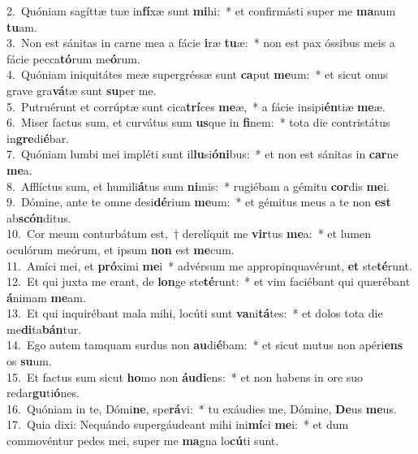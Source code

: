 {2.~}Quóniam sagíttæ tuæ in\textbf{fí}xæ sunt \textbf{mi}hi:~* et confirmásti super me \textbf{ma}num \textbf{tu}am.\\
{3.~}Non est sánitas in carne mea a fácie \textbf{i}ræ \textbf{tu}æ:~* non est pax óssibus meis a fácie pecca\textbf{tó}rum me\textbf{ó}rum.\\
{4.~}Quóniam iniquitátes meæ supergréssæ sunt \textbf{ca}put \textbf{me}um:~* et sicut onus grave gra\textbf{vá}tæ sunt \textbf{su}per me.\\
{5.~}Putruérunt et corrúptæ sunt cica\textbf{trí}ces \textbf{me}æ,~* a fácie insipi\textbf{én}tiæ \textbf{me}æ.\\
{6.~}Miser factus sum, et curvátus sum \textbf{us}que in \textbf{fi}nem:~* tota die contristátus in\textbf{gre}di\textbf{é}bar.\\
{7.~}Quóniam lumbi mei impléti sunt il\textbf{lu}si\textbf{ó}\textbf{ni}bus:~* et non est sánitas in \textbf{car}ne \textbf{me}a.\\
{8.~}Afflíctus sum, et humili\textbf{á}tus sum \textbf{ni}mis:~* rugiébam a gémitu \textbf{cor}dis \textbf{me}i.\\
{9.~}Dómine, ante te omne desi\textbf{dé}rium \textbf{me}um:~* et gémitus meus a te non \textbf{est} ab\textbf{scón}ditus.\\
{10.~}Cor meum conturbátum est,~† derelíquit me \textbf{vir}tus \textbf{me}a:~* et lumen oculórum meórum, et ipsum \textbf{non} est \textbf{me}cum.\\
{11.~}Amíci mei, et \textbf{pró}ximi \textbf{me}i~* advérsum me appropinquavérunt, \textbf{et} ste\textbf{té}runt.\\
{12.~}Et qui juxta me erant, de \textbf{lon}ge ste\textbf{té}runt:~* et vim faciébant qui quærébant \textbf{á}nimam \textbf{me}am.\\
{13.~}Et qui inquirébant mala mihi, locúti sunt \textbf{va}ni\textbf{tá}tes:~* et dolos tota die me\textbf{di}ta\textbf{bán}tur.\\
{14.~}Ego autem tamquam surdus non \textbf{au}di\textbf{é}bam:~* et sicut mutus non apéri\textbf{ens} os \textbf{su}um.\\
{15.~}Et factus sum sicut \textbf{ho}mo non \textbf{áu}\textbf{di}ens:~* et non habens in ore suo redar\textbf{gu}ti\textbf{ó}nes.\\
{16.~}Quóniam in te, Dómi\textbf{ne}, spe\textbf{rá}vi:~* tu exáudies me, Dómine, \textbf{De}us \textbf{me}us.\\
{17.~}Quia dixi: Nequándo supergáudeant mihi ini\textbf{mí}ci \textbf{me}i:~* et dum commovéntur pedes mei, super me \textbf{ma}gna lo\textbf{cú}ti sunt.\\
